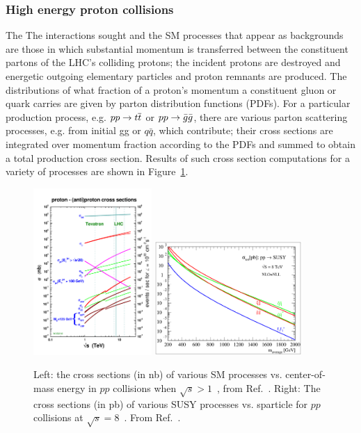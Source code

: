 \subsubsection{High energy proton collisions}
The 
The interactions sought and the SM processes that appear as backgrounds are those in 
which substantial momentum is transferred between the constituent partons of the LHC's 
colliding protons; the incident protons are destroyed and energetic outgoing elementary 
particles and proton remnants are produced. The distributions of what fraction of a 
proton's momentum a constituent gluon or quark carries are given by parton distribution 
functions (PDFs). For a particular production process, e.g. $pp \rightarrow \relax{t}\overline{\relax{t}}$ or 
$pp \rightarrow \bar{g}\bar{g}$, there are various parton scattering processes, e.g. 
from initial gg or $q\bar{q}$, which contribute; their cross sections are integrated over momentum fraction according to 
the PDFs and summed to obtain a total production cross section.
Results of such cross section computations for a variety of processes are shown
in Figure~\ref{fig:crossSec}.

\begin{figure}[h!]
  \begin{center}
      \includegraphics[width=0.40\textwidth,trim=0 2cm 0 0]{figures/crosssections2012_v5}
      \includegraphics[width=0.5\textwidth, ]{figures/nlonll_lhc8_tpformat.eps}
      \caption{\label{fig:crossSec} Left: the cross sections (in nb) of various SM processes vs. center-of-mass
              energy in $pp$ collisions when $\sqrt{s}>1$~\TeV, from Ref.~\cite{stirling-xs}. Right: 
              The cross sections (in pb) of various SUSY processes vs. sparticle for $pp$ collisions
              at $\sqrt{s}=8$~\TeV. From Ref.~\cite{Beenakker:1996ed}.} 
  \end{center}
\end{figure}

